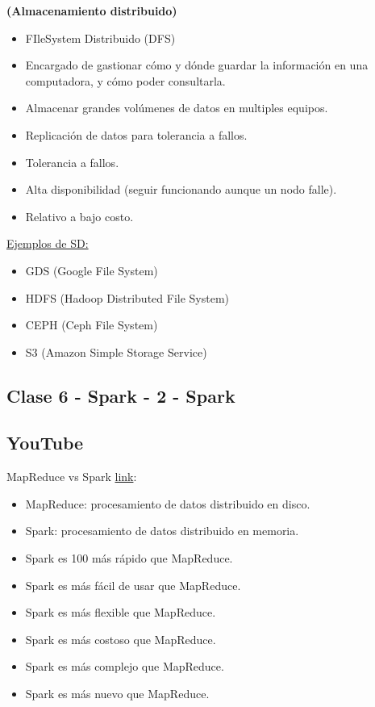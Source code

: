 \documentclass[../main.tex]{subfiles}
\begin{document}
    \begin{definition} \textbf{(Almacenamiento distribuido)}
        \begin{itemize}
            \item FIleSystem Distribuido (DFS)
            \item Encargado de gastionar cómo y dónde guardar la información en una computadora, y cómo poder consultarla.
            \item Almacenar grandes volúmenes de datos en multiples equipos.
            \item Replicación de datos para tolerancia a fallos.
            \item Tolerancia a fallos.
            \item Alta disponibilidad (seguir funcionando aunque un nodo falle).
            \item Relativo a bajo costo.
        \end{itemize}
        
        \underline{Ejemplos de SD:}
        \begin{itemize}
            \item GDS (Google File System)
            \item HDFS (Hadoop Distributed File System)
            \item CEPH (Ceph File System)
            \item S3 (Amazon Simple Storage Service)
        \end{itemize}
    \end{definition}

\subsection{Clase 6 - Spark - 2 - Spark}


\subsection{YouTube}
    MapReduce vs Spark \href{https://www.youtube.com/watch?v=Z-iNJypyZTQ&list=PLlhVpWerA0Ky2GVx1yE7LW_Xtq_DruUSB&index=2}{link}:
    \begin{itemize}
        \item MapReduce: procesamiento de datos distribuido en disco.
        \item Spark: procesamiento de datos distribuido en memoria.
        \item Spark es 100 más rápido que MapReduce.
        \item Spark es más fácil de usar que MapReduce.
        \item Spark es más flexible que MapReduce.
        \item Spark es más costoso que MapReduce.
        \item Spark es más complejo que MapReduce.
        \item Spark es más nuevo que MapReduce.
    \end{itemize}
\end{document}
